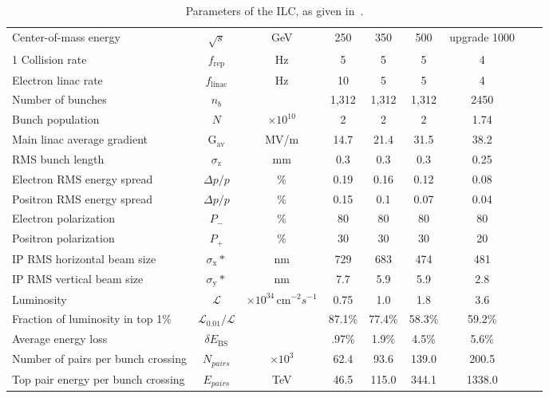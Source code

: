         \begin{landscape}
        \begin{table}
        \begin{center}
        \begin{tabular}{|lcc|c|c|c|c|c|c|}
                \hline
                Center-of-mass energy &$\sqrt{s}$ &GeV  			& 250 & 350 & 500 & upgrade 1000 \\ 1
                Collision rate &$f_{\text{rep}}$ &Hz  				& 5 & 5 & 5 & 4 \\ 
                Electron linac rate &$f_{\text{linac}}$ &Hz  		& 10 & 5 & 5 & 4 \\ 
                Number of bunches &$n_b$ &							& 1,312 & 1,312 & 1,312 & 2450 \\ 
                Bunch population &$N$ &$\times 10^{10}$ 			& 2 & 2 & 2 & 1.74 \\ 
                Main linac average gradient &G$_{\text{av}}$ &MV/m  & 14.7 & 21.4 & 31.5 & 38.2 \\  \hline

                RMS bunch length &$\sigma_{\text{z}}$ &mm 			& 0.3 & 0.3 & 0.3 & 0.25 \\ 
                Electron RMS energy spread &$\Delta p/p$ &\%  		& 0.19 & 0.16 & 0.12 & 0.08 \\ 
                Positron RMS energy spread &$\Delta p/p$ &\%  		& 0.15 & 0.1 & 0.07 & 0.04 \\ 
                Electron polarization &$P_-$ &\%  					& 80 & 80 & 80 & 80 \\ 
                Positron polarization &$P_+$ &\%  					& 30 & 30 & 30 & 20 \\ 
                IP RMS horizontal beam size &$\sigma_{\text{x}}*$ &nm& 729 & 683 & 474 & 481 \\ 

                IP RMS vertical beam size &$\sigma_{\text{y}}*$ &nm  & 7.7 & 5.9 & 5.9 & 2.8 \\ \hline
                Luminosity &$\mathcal{L}$ &$\times 10^{34}$\,cm$^{-2}s^{-1}$ & 0.75 & 1.0 & 1.8 & 3.6 \\ 
                Fraction of luminosity in top 1\% &$\mathcal{L}_{0.01}/\mathcal{L}$ & & 87.1\% & 77.4\% & 58.3\% & 59.2\% \\ 
                Average energy loss &$\delta E_{\text{BS}}$&  & .97\% & 1.9\% & 4.5\% & 5.6\% \\  \hline
				Number of pairs per bunch crossing &$N_{pairs}$ &$\times 10^3$ & 62.4 & 93.6 & 139.0 & 200.5 \\ 
                Top pair energy per bunch crossing &$E_{pairs}$ &TeV & 46.5 & 115.0 & 344.1 & 1338.0 \\ \hline
        \end{tabular}
        \end{center}
        \caption{Parameters of the ILC, as given in~\cite{bib:ILC}. }
        \label{tab:ILCparam}
        \end{table}
        \end{landscape}

